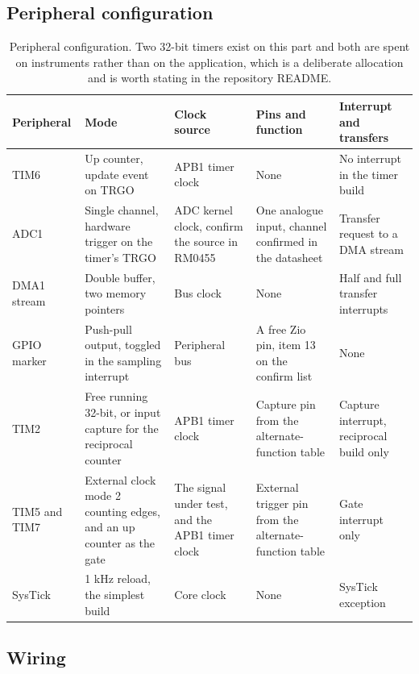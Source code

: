 \subsection*{Peripheral configuration}

\begin{table}[H]\centering\small
\begin{tabular}{p{20mm}p{28mm}p{24mm}p{30mm}p{30mm}}
\toprule
Peripheral & Mode & Clock source & Pins and function & Interrupt and transfers \\
\midrule
TIM6 & Up counter, update event on TRGO & APB1 timer clock & None & No interrupt in the timer build \\
ADC1 & Single channel, hardware trigger on the timer's TRGO & ADC kernel clock, confirm the source in RM0455 & One analogue input, channel confirmed in the datasheet & Transfer request to a DMA stream \\
DMA1 stream & Double buffer, two memory pointers & Bus clock & None & Half and full transfer interrupts \\
GPIO marker & Push-pull output, toggled in the sampling interrupt & Peripheral bus & A free Zio pin, item 13 on the confirm list & None \\
TIM2 & Free running 32-bit, or input capture for the reciprocal counter & APB1 timer clock & Capture pin from the alternate-function table & Capture interrupt, reciprocal build only \\
TIM5 and TIM7 & External clock mode 2 counting edges, and an up counter as the gate & The signal under test, and the APB1 timer clock & External trigger pin from the alternate-function table & Gate interrupt only \\
SysTick & 1 kHz reload, the simplest build & Core clock & None & SysTick exception \\
\bottomrule
\end{tabular}
\caption{Peripheral configuration. Two 32-bit timers exist on this part and both are spent on instruments rather than on the application, which is a deliberate allocation and is worth stating in the repository README.}
\end{table}

\subsection*{Wiring}


